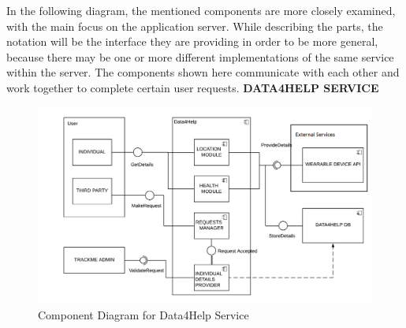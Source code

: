 In the following diagram, the mentioned components are more closely examined, with the main focus on the application server. While describing the parts, the notation will be the interface they are providing in order to be more general, because there may be one or more different implementations of the same service within the server. The components shown here communicate with each other and work together to complete certain user requests.\newline\newline
\textbf{DATA4HELP SERVICE}
\begin{figure}[H]
	\begin{center}
		\includegraphics[width=\textwidth]{./DD_Diagrams/ComponentData4Help.png}
      	\caption{Component Diagram for Data4Help Service}
        \label{TrackMe_c1}
	\end{center}
\end{figure}

